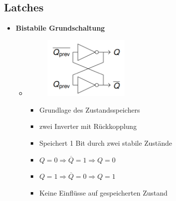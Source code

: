 \documentclass[11pt,a4paper]{article}
\begin{document}
\subsection{Latches}
\begin{itemize}

\item \textbf{Bistabile Grundschaltung}
	\begin{itemize}
	
	
	\item[]		
				\begin{minipage}{0.25\textwidth}
					\begin{figure}[H]
					\includegraphics[height=3cm]{Bilder/bistabil}
					\end{figure}
				\end{minipage}
				\begin{minipage}[t]{0.6\textwidth}
					\vspace{-1.5cm}
					\begin{itemize}
					\item Grundlage des Zustandsspeichers
					\item zwei Inverter mit Rückkopplung
					\item Speichert 1 Bit durch zwei stabile Zustände
					\item $Q=0 \Rightarrow \overline{Q} =1 \Rightarrow Q=0$
					\item $Q=1 \Rightarrow \overline{Q} =0 \Rightarrow Q=1$
					\item Keine Einflüsse auf gespeicherten Zustand
					\end{itemize}
				\end{minipage}
	
	\end{itemize}
	

\end{itemize}
\end{document}
